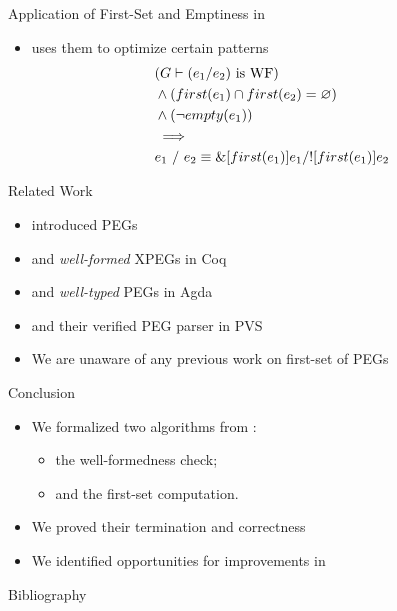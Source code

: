 \documentclass{beamer}
\begin{document}
\begin{frame}{Application of First-Set and Emptiness in \lpeg{}}
    \begin{itemize}
        \item \lpeg{} uses them to optimize certain patterns
        \begin{align*}
            & (\text{$G \vdash (e_1/e_2)$ is WF}) \\
            & \wedge (first(e_1) \cap first(e_2) = \varnothing{}) \\
            & \wedge (\neg empty(e_1)) \\
            & \implies \\
            & e_1\ /\ e_2 \equiv \&[first(e_1)]e_1/![first(e_1)]e_2
        \end{align*}
    \end{itemize}
\end{frame}

\begin{frame}{Related Work}
    \begin{itemize}
        \item \cite{ford_parsing_2004} introduced PEGs
        \item \cite{koprowski_trx_2011} and \emph{well-formed} XPEGs in Coq
        \item \cite{ribeiro_towards_2019} and \emph{well-typed} PEGs in Agda
        \item \cite{blaudeau_verified_2020} and their verified PEG parser in PVS
        \item We are unaware of any previous work on first-set of PEGs
    \end{itemize}
\end{frame}

\begin{frame}{Conclusion}
    \begin{itemize}
        \item We formalized two algorithms from \lpeg{}:
        \begin{itemize}
            \item the well-formedness check;
            \item and the first-set computation.
        \end{itemize}
        \item We proved their termination and correctness
        \item We identified opportunities for improvements in \lpeg{}
    \end{itemize}
\end{frame}

\begin{frame}{Bibliography}
    
    
\end{frame}
\end{document}
